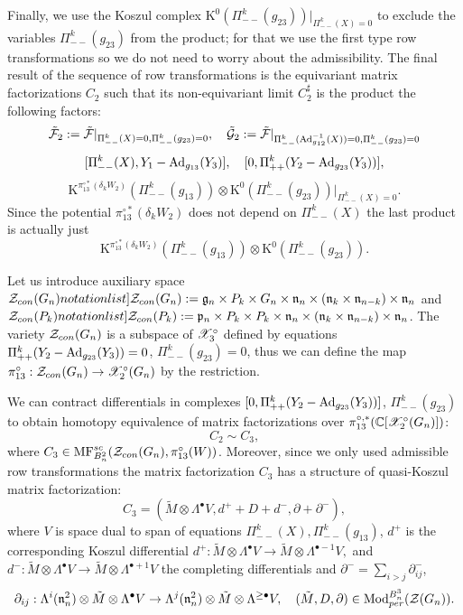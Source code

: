  Finally, we use the Koszul complex $\mathrm{K}^{0} (\Pi_{--}^{k}(g_{23}))|_{\Pi_{--}^k(X)=0}$ to exclude the variables $\Pi_{--}^k(g_{23})$ from the product; for that
 we use the first type row transformations so we do not need to worry about the admissibility. The final result of the sequence of row transformations is the
 equivariant matrix factorizations $C_2$ such that its non-equivariant limit $C_2^\sharp$ is the product the following factors:
 $$\tilde{\mathcal{F}}_2:= \tilde{\mathcal{F}}|_{\Pi_{--}^k(X)=0,\Pi_{--}^k(g_{23})=0},\quad
     \tilde{\mathcal{G}}_2:= \tilde{\mathcal{F}}|_{\Pi_{--}^k({\rm Ad}_{g_{12}}^{-1}(X))=0, \Pi_{--}^k(g_{23})=0}$$
 $$[\Pi^k_{--}(X),Y_1-{\rm Ad}_{g_{13}}(Y_3)],\quad     [0,\Pi_{++}^k(Y_2-{\rm Ad}_{g_{23}}(Y_3))],$$
$$ \mathrm{K}^{\pi_{13}^{\circ*}(\delta_k W_2)} (\Pi_{--}^{k}(g_{13}))\otimes \mathrm{K}^{0} (\Pi_{--}^{k}(g_{23}))|_{\Pi_{--}^k(X)=0}.$$
Since the potential $\pi_{13}^{\circ*}(\delta_k W_2)$ does not depend on $\Pi_{--}^{k}(X)$ the last product is actually just
 $$ \mathrm{K}^{\pi_{13}^{\circ*}(\delta_k W_2)} (\Pi_{--}^{k}(g_{13}))\otimes \mathrm{K}^{0} (\Pi_{--}^{k}(g_{23})).$$

 Let us introduce auxiliary space $\SymbolPrint{\calZ_{con}(G_n)}:=\frg_n\times P_k\times G_n\times \frn_n\times (\frn_k\times \frn_{n-k})\times \frn_n$
 and $\SymbolPrint{\calZ_{con}(P_k)}:=\frp_n\times P_k\times P_k\times \frn_n\times (\frn_k\times \frn_{n-k})\times \frn_n$. The variety $\mathcal{Z}_{con}(G_n)$ is a subspace of
 $\mathscr{X}^\circ_3$ defined by equations $\Pi_{++}^k(Y_2-{\rm Ad}_{g_{23}}(Y_3))=0$, $\Pi_{--}^k(g_{23})=0$, thus we can define the map $\pi_{13}^\circ:\mathcal{Z}_{con}(G_n)\to
 \mathscr{X}_2^\circ(G_n)$ by the restriction.

   We can contract  differentials in complexes $ [0,\Pi_{++}^k(Y_2-{\rm Ad}_{g_{23}}(Y_3))]$,
 $\Pi_{--}^{k}(g_{23})$ to obtain homotopy equivalence of matrix factorizations over $\pi_{13}^{\circ,*}(\mathbb{C}[\mathscr{X}^\circ_2(G_n)])$:
 $$ C_2\sim C_3,$$
 where $C_3\in \mathrm{MF}^{sc}_{B_n^2}(\mathcal{Z}_{con}(G_n),\pi_{13}^\circ(W))$. Moreover, since we only used admissible row transformations the matrix factorization $C_3$ has a
 structure of quasi-Koszul matrix factorization:
 $$ C_3=(\tilde{M}\otimes \Lambda^\bullet V, d^++D+d^-,\partial+\partial^-),$$
 where $V$ is space dual to span of equations $\Pi_{--}^k(X),\Pi_{--}^k(g_{13})$, $d^+$ is the corresponding Koszul differential
$d^+:\tilde{M}\otimes\Lambda^\bullet V\to \tilde{M}\otimes \Lambda^{\bullet-1} V,$ and $d^-: \tilde{M}\otimes\Lambda^\bullet V\to \tilde{M}\otimes \Lambda^{\bullet+1} V$
the completing differentials and \(\partial^-=\sum_{i>j} \partial_{ij}^-\), \[\partial_{ij}: \Lambda^i (\mathfrak{n}_n^2)\otimes \tilde{M}\otimes \Lambda^\bullet V\to
\Lambda^j (\mathfrak{n}_n^2)\otimes \tilde{M}\otimes \Lambda^{\ge\bullet} V, \quad (\tilde{M},D,\partial)\in \mathrm{Mod}_{per}^{B_n^3}(\mathcal{Z}(G_n)).\]

